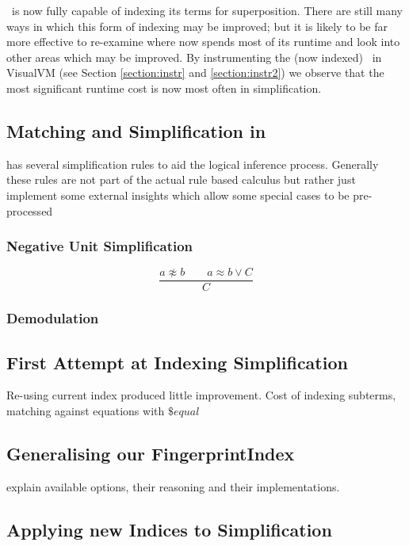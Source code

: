 \Beagle\ is now fully capable of indexing its terms for superposition. There
are still many ways in which this form of indexing may be improved; but it is likely
to be far more effective to re-examine where \beagle now spends most of its runtime
and look into other areas which may be improved. By instrumenting the (now indexed)
\beagle\ in VisualVM (see Section \ref{section:instr} and \ref{section:instr2})
we observe that the most significant runtime cost is now most often in simplification.

\subsection{Matching and Simplification in \Beagle}
\Beagle has several simplification rules to aid the logical inference process.
Generally these rules are not part of the actual rule based calculus but rather
just implement some external insights which allow some special cases to be
pre-processed

\subsubsection{Negative Unit Simplification}

\[ \frac{a\not\approx b \quad \quad a \approx b  \lor C}{C} \]

\subsubsection{Demodulation}


\subsection{First Attempt at Indexing Simplification}
Re-using current index produced little improvement. Cost of indexing
subterms, matching against equations with $\$equal$

\subsection{Generalising our FingerprintIndex}

explain available options, their reasoning and their implementations.

\subsection{Applying new Indices to Simplification}


